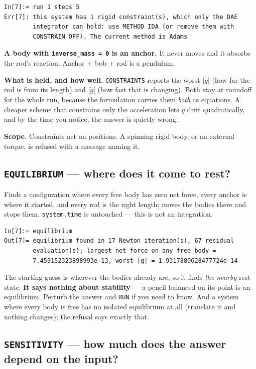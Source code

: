 \documentclass[11pt]{article}
\newcommand{\kw}[1]{\texttt{\uppercase{#1}}}
\newcommand{\code}[1]{\texttt{#1}}
\begin{document}
\begin{lstlisting}
In[7]:= run 1 steps 5
Err[7]: this system has 1 rigid constraint(s), which only the DAE
        integrator can hold: use METHOD IDA (or remove them with
        CONSTRAIN OFF). The current method is Adams
\end{lstlisting}

\textbf{A body with \code{inverse\_mass = 0} is an anchor.} It never
moves and it absorbs the rod's reaction. Anchor + bob + rod is a
pendulum.

\textbf{What is held, and how well.} \kw{constraints} reports the worst
$|g|$ (how far the rod is from its length) and $|\dot g|$ (how fast that
is changing). Both stay at roundoff for the whole run, because the
formulation carries them \emph{both} as equations. A cheaper scheme that
constrains only the acceleration lets $g$ drift quadratically, and by
the time you notice, the answer is quietly wrong.

\textbf{Scope.} Constraints act on positions. A spinning rigid body, or
an external torque, is refused with a message naming it.

\subsection{\kw{equilibrium} --- where does it come to rest?}

Finds a configuration where every free body has zero net force, every
anchor is where it started, and every rod is the right length; moves the
bodies there and stops them. \code{system.time} is untouched --- this is
not an integration.

\begin{lstlisting}
In[7]:= equilibrium
Out[7]= equilibrium found in 17 Newton iteration(s), 67 residual
        evaluation(s); largest net force on any free body =
        7.459152323898993e-13, worst |g| = 1.9317880628477724e-14
\end{lstlisting}

The starting guess is wherever the bodies already are, so it finds
\emph{the nearby} rest state. \textbf{It says nothing about stability}
--- a pencil balanced on its point is an equilibrium. Perturb the answer
and \kw{run} if you need to know. And a system where every body is free
has no isolated equilibrium at all (translate it and nothing changes);
the refusal says exactly that.

\subsection{\kw{sensitivity} --- how much does the answer depend on the input?}
\end{document}
